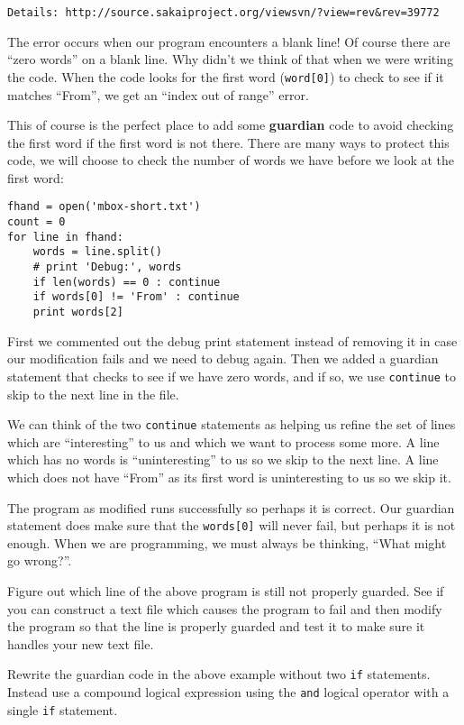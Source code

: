 \begin{enumerate}
\begin{verbatim}
Details: http://source.sakaiproject.org/viewsvn/?view=rev&rev=39772
\end{verbatim}
\afterverb
%
The error occurs when our program encounters a blank line! Of course there
are ``zero words'' on a blank line.  Why didn't we think of that 
when we were writing the code.  When the code looks for the first
word (\verb"word[0]") to check to see if it matches ``From'', 
we get an ``index out of range'' error.

This of course is the perfect place to add some {\bf guardian} code 
to avoid checking the first word if the first word is not there.
There are many ways to protect this code, we will choose to 
check the number of words we have before we look at the first word:

\beforeverb
\begin{verbatim}
fhand = open('mbox-short.txt')
count = 0
for line in fhand:
    words = line.split()
    # print 'Debug:', words
    if len(words) == 0 : continue
    if words[0] != 'From' : continue
    print words[2]
\end{verbatim}
\afterverb
%
First we commented out the debug print statement instead of removing it 
in case our modification fails and we need to debug again.  Then we added
a guardian statement that checks to see if we have zero words, and if so, 
we use {\tt continue} to skip to the next line in the file.

We can think of the two {\tt continue} statements as helping us refine
the set of lines which are ``interesting'' to us and which we want 
to process some more.  A line which has no words is ``uninteresting'' to 
us so we skip to the next line.  A line which does not have ``From''
as its first word is uninteresting to us so we skip it.

The program as modified runs successfully so perhaps it is correct.  Our
guardian statement does make sure that the {\tt words[0]} will never fail, 
but perhaps it is not enough.  When we are programming, we must always be 
thinking, ``What might go wrong?''.

\begin{ex}
Figure out which line of the above program is still not properly guarded.
See if you can construct a text file which causes the program to fail
and then modify the program so that the line is properly guarded and 
test it to make sure it handles your new text file.
\end{ex}

\begin{ex}
Rewrite the guardian code in the above example without two
{\tt if} statements.  Instead use a compound logical expression using the
{\tt and} logical operator with a single {\tt if} statement.
\end{ex}


\end{enumerate}



